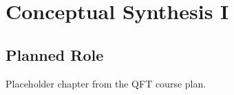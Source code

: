 \chapter{Conceptual Synthesis I}

\section{Planned Role}

Placeholder chapter from the QFT course plan.
